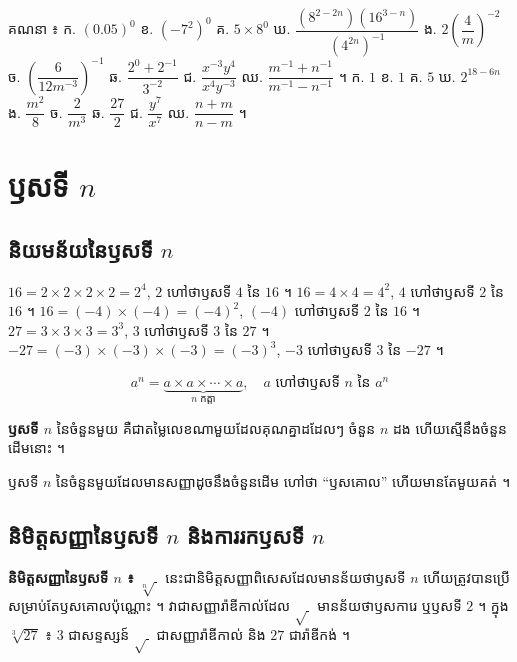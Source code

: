 \begin{pro}
គណនា ៖ \quad ក. $(0.05)^0$ \quad ខ. $(-7^2)^0$ \quad គ. $5\times 8^0$ \quad ឃ. $\dfrac{(8^{2-2n})(16^{3-n})}{(4^{2n})^{-1}}$ \quad ង. $2\left(\dfrac{4}{m}\right)^{-2}$ \quad ច. $\left(\dfrac{6}{12m^{-3}}\right)^{-1}$ \quad ឆ. $\dfrac{2^0 + 2^{-1}}{3^{-2}}$ \quad ជ. $\dfrac{x^{-3}y^4}{x^4y^{-3}}$ \quad ឈ. $\dfrac{m^{-1} + n^{-1}}{m^{-1} - n^{-1}}$ ។
\ans
ក. $1$ \quad ខ. $1$ \quad គ. $5$ \quad ឃ. $2^{18-6n}$ \quad ង. $\dfrac{m^2}{8}$ \quad ច. $\dfrac{2}{m^3}$ \quad ឆ. $\dfrac{27}{2}$ \quad ជ. $\dfrac{y^7}{x^7}$ \quad ឈ. $\dfrac{n + m}{n - m}$ ។
\end{pro}

\section{ឫសទី \texorpdfstring{$n$}{n}}
\subsection{និយមន័យនៃឫសទី \texorpdfstring{$n$}{n}}

\begin{example}[ឧទាហរណ៍]
$16 = 2\times 2\times 2\times 2 = 2^4$, $2$ ហៅថាឫសទី $4$ នៃ $16$ ។ $16 = 4\times 4 = 4^2$, $4$ ហៅថាឫសទី $2$ នៃ $16$ ។ $16 = (-4)\times(-4) = (-4)^2$, $(-4)$ ហៅថាឫសទី $2$ នៃ $16$ ។ $27 = 3\times 3\times 3 = 3^3$, $3$ ហៅថាឫសទី $3$ នៃ $27$ ។ $-27 = (-3)\times(-3)\times(-3) = (-3)^3$, $-3$ ហៅថាឫសទី $3$ នៃ $-27$ ។
\end{example}

\begin{formulaBox}[ជាទូទៅ]
\[
a^n = \underbrace{a\times a\times\cdots\times a}_{n \text{ កត្តា}}, \quad a \text{ ហៅថាឫសទី } n \text{ នៃ } a^n
\]
\end{formulaBox}
\begin{definition}[និយមន័យ]
\textbf{ឫសទី $n$} នៃចំនួនមួយ គឺជាតម្លៃលេខណាមួយដែលគុណគ្នាដដែលៗ ចំនួន $n$ ដង ហើយស្មើនឹងចំនួនដើមនោះ ។
\end{definition}
\begin{note}[សម្គាល់]
ឫសទី $n$ នៃចំនួនមួយដែលមានសញ្ញាដូចនឹងចំនួនដើម ហៅថា “ឫសគោល” ហើយមានតែមួយគត់ ។
\end{note}

\subsection{និមិត្តសញ្ញានៃឫសទី \texorpdfstring{$n$}{n} និងការរកឫសទី \texorpdfstring{$n$}{n}}
\textbf{និមិត្តសញ្ញានៃឫសទី $n$ ៖} $\sqrt[n]{\ }$ នេះជានិមិត្តសញ្ញាពិសេសដែលមានន័យថាឫសទី $n$ ហើយត្រូវបានប្រើសម្រាប់តែឫសគោលប៉ុណ្ណោះ ។ វាជាសញ្ញារ៉ាឌីកាល់ដែល $\sqrt{\ }$ មានន័យថាឫសការេ ឬឫសទី $2$ ។ ក្នុង $\sqrt[3]{27}$ ៖ $3$ ជាសន្ទស្សន៍ $\sqrt{\ }$ ជាសញ្ញារ៉ាឌីកាល់ និង $27$ ជារ៉ាឌីកង់ ។

